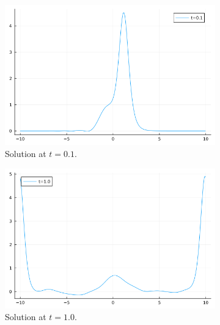 \documentclass[12pt]{report}
\begin{document}
\begin{solution}
\begin{enumerate}
        \begin{figure}[H]
            \begin{subfigure}[b]{0.45\linewidth}
                \centering
                \includegraphics[width=\linewidth]{images/2-1.png}
                \caption{Solution at $t=0.1$.}
                \label{fig2:a}
                \vspace{4ex}
            \end{subfigure}%
            \begin{subfigure}[b]{0.45\linewidth}
                \centering
                \includegraphics[width=\linewidth]{images/2-2.png}
                \caption{Solution at $t=1.0$.}
                \label{fig2:b}
                \vspace{4ex}
            \end{subfigure}
            \begin{subfigure}[b]{0.45\linewidth}

\end{subfigure}
\end{figure}
\end{enumerate}
\end{solution}
\end{document}

